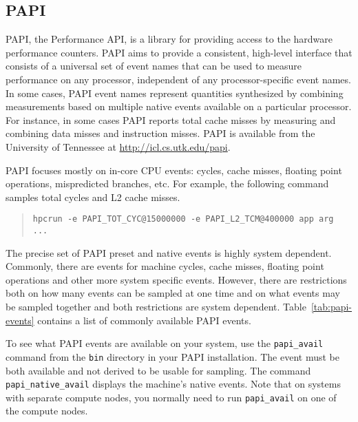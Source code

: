 \subsection{PAPI}
\label{section:papi}

PAPI, the Performance API, is a library for providing access to the
hardware performance counters. PAPI aims to provide a
consistent, high-level interface that consists of a universal set of event names that can be used 
to measure performance on any processor, independent of any processor-specific event names. 
In some cases, PAPI event names
represent quantities synthesized by combining measurements based on multiple native events 
available on a particular processor.
For instance, in some cases PAPI reports
total cache misses by measuring and combining data misses and instruction misses. 
PAPI is available from the University of Tennessee at \url{http://icl.cs.utk.edu/papi}.

PAPI focuses mostly on in-core CPU events: cycles, cache misses,
floating point operations, mispredicted branches, etc.  For example,
the following command samples total cycles and L2 cache misses.

\begin{quote}
\begin{verbatim}
hpcrun -e PAPI_TOT_CYC@15000000 -e PAPI_L2_TCM@400000 app arg ...
\end{verbatim}
\end{quote}

The precise set of PAPI preset and native events is highly system
dependent.  Commonly, there are events for machine cycles, cache
misses, floating point operations and other more system specific
events.  However, there are restrictions both on how many events can
be sampled at one time and on what events may be sampled together and
both restrictions are system dependent.  Table~\ref{tab:papi-events}
contains a list of commonly available PAPI events.

To see what PAPI events are available on your system, use the
\verb|papi_avail| command from the \verb|bin| directory in your PAPI
installation.  The event must be both available and not derived to be
usable for sampling.  The command \verb|papi_native_avail| displays
the machine's native events.  Note that on systems with separate
compute nodes, you normally need to run \verb|papi_avail| on one of
the compute nodes.

